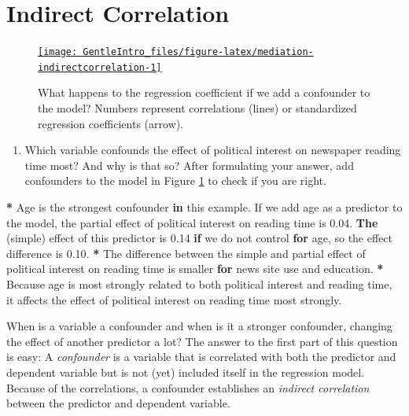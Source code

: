 \documentclass[a4paper]{book}
\newenvironment{Shaded}{\begin{snugshade}}{\end{snugshade}}
\newcommand{\KeywordTok}[1]{\textcolor[rgb]{0,0,0}{\textbf{#1}}}
\newcommand{\FloatTok}[1]{\textcolor[rgb]{0.00,0.00,0.00}{#1}}
\newcommand{\StringTok}[1]{\textcolor[rgb]{0.00,0.00,0.00}{#1}}
\newcommand{\ControlFlowTok}[1]{\textcolor[rgb]{0.00,0.00,0.00}{\textbf{#1}}}
\newcommand{\OperatorTok}[1]{\textcolor[rgb]{0.00,0.00,0.00}{\textbf{#1}}}
\newcommand{\NormalTok}[1]{#1}
\providecommand{\tightlist}{%
  \setlength{\itemsep}{0pt}\setlength{\parskip}{0pt}}
\theoremstyle{definition}
\theoremstyle{definition}
\theoremstyle{definition}
\theoremstyle{remark}
\begin{document}
\section{Indirect Correlation}\label{indirectcorrelation}

\begin{figure}[H]
\href{http://82.196.4.233:3838/apps/mediation-indirectcorrelation/}{\texttt{[image: GentleIntro\_files/figure-latex/mediation-indirectcorrelation-1]} }\caption{What happens to the regression coefficient if we add a confounder to the model? Numbers represent correlations (lines) or standardized regression coefficients (arrow).}\label{fig:mediation-indirectcorrelation}
\end{figure}

\begin{enumerate}
\def\labelenumi{\arabic{enumi}.}
\tightlist
\item
  Which variable confounds the effect of political interest on newspaper
  reading time most? And why is that so? After formulating your answer,
  add confounders to the model in Figure
  \ref{fig:mediation-indirectcorrelation} to check if you are right.
\end{enumerate}

\begin{Shaded}
\begin{Highlighting}[]
\OperatorTok{*}\StringTok{ }\NormalTok{Age is the strongest confounder }\ControlFlowTok{in}\NormalTok{ this example. If we add age as a}
\NormalTok{predictor to the model, the partial effect of political interest on reading}
\NormalTok{time is }\FloatTok{0.04}\NormalTok{. }\KeywordTok{The}\NormalTok{ (simple) effect of this predictor is }\FloatTok{0.14} \ControlFlowTok{if}\NormalTok{ we do not}
\NormalTok{control }\ControlFlowTok{for}\NormalTok{ age, so the effect difference is }\FloatTok{0.10}\NormalTok{.}
\OperatorTok{*}\StringTok{ }\NormalTok{The difference between the simple and partial effect of political interest}
\NormalTok{on reading time is smaller }\ControlFlowTok{for}\NormalTok{ news site use and education.}
\OperatorTok{*}\StringTok{ }\NormalTok{Because age is most strongly related to both political interest and reading}
\NormalTok{time, it affects the effect of political interest on reading time most}
\NormalTok{strongly.}
\end{Highlighting}
\end{Shaded}

When is a variable a confounder and when is it a stronger confounder,
changing the effect of another predictor a lot? The answer to the first
part of this question is easy: A \emph{confounder} is a variable that is
correlated with both the predictor and dependent variable but is not
(yet) included itself in the regression model. Because of the
correlations, a confounder establishes an \emph{indirect correlation}
between the predictor and dependent variable.
\end{document}
